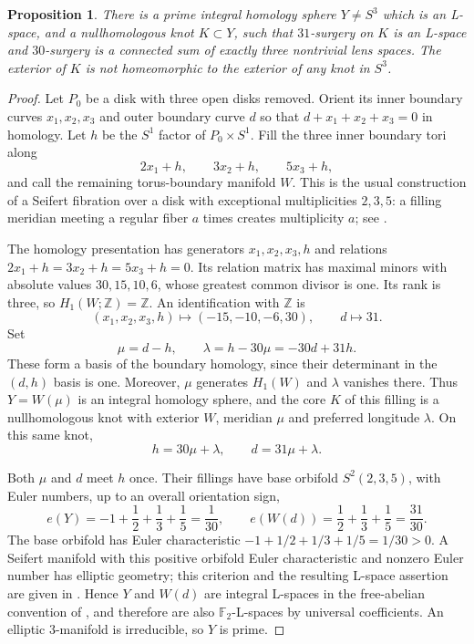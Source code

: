 \documentclass[11pt]{article}
\newtheorem{proposition}[theorem]{Proposition}
\theoremstyle{remark}
\newcommand{\Z}{\mathbb Z}
\newcommand{\F}{\mathbb F_2}
\begin{document}
\begin{proposition}\label{prop:ambient}
There is a prime integral homology sphere $Y\ne S^3$ which is an L-space, and a nullhomologous knot $K\subset Y$, such that $31$-surgery on $K$ is an L-space and $30$-surgery is a connected sum of exactly three nontrivial lens spaces. The exterior of $K$ is not homeomorphic to the exterior of any knot in $S^3$.
\end{proposition}
\begin{proof}
Let $P_0$ be a disk with three open disks removed. Orient its inner boundary curves $x_1,x_2,x_3$ and outer boundary curve $d$ so that $d+x_1+x_2+x_3=0$ in homology. Let $h$ be the $S^1$ factor of $P_0\times S^1$. Fill the three inner boundary tori along
\[
 2x_1+h,\qquad3x_2+h,\qquad5x_3+h,
\]
and call the remaining torus-boundary manifold $W$. This is the usual construction of a Seifert fibration over a disk with exceptional multiplicities $2,3,5$: a filling meridian meeting a regular fiber $a$ times creates multiplicity $a$; see \cite[Section~2.1, pp.~24--26]{Hatcher}.

The homology presentation has generators $x_1,x_2,x_3,h$ and relations $2x_1+h=3x_2+h=5x_3+h=0$. Its relation matrix has maximal minors with absolute values $30,15,10,6$, whose greatest common divisor is one. Its rank is three, so $H_1(W;\Z)=\Z$. An identification with $\Z$ is
\[
 (x_1,x_2,x_3,h)\longmapsto(-15,-10,-6,30),\qquad d\longmapsto31.
\]
Set
\[
 \mu=d-h,\qquad \lambda=h-30\mu=-30d+31h.
\]
These form a basis of the boundary homology, since their determinant in the $(d,h)$ basis is one. Moreover, $\mu$ generates $H_1(W)$ and $\lambda$ vanishes there. Thus $Y=W(\mu)$ is an integral homology sphere, and the core $K$ of this filling is a nullhomologous knot with exterior $W$, meridian $\mu$ and preferred longitude $\lambda$. On this same knot,
\[
 h=30\mu+\lambda,\qquad d=31\mu+\lambda.
\]

Both $\mu$ and $d$ meet $h$ once. Their fillings have base orbifold $S^2(2,3,5)$, with Euler numbers, up to an overall orientation sign,
\[
 e(Y)=-1+\frac12+\frac13+\frac15=\frac1{30},
 \qquad e(W(d))=\frac12+\frac13+\frac15=\frac{31}{30}.
\]
The base orbifold has Euler characteristic $-1+1/2+1/3+1/5=1/30>0$. A Seifert manifold with this positive orbifold Euler characteristic and nonzero Euler number has elliptic geometry; this criterion and the resulting L-space assertion are given in \cite[Proposition~2.3 and its proof]{OSLens}. Hence $Y$ and $W(d)$ are integral L-spaces in the free-abelian convention of \cite[Definition~1.1]{OSLens}, and therefore are also $\F$-L-spaces by universal coefficients. An elliptic $3$-manifold is irreducible, so $Y$ is prime.


\end{proof}
\end{document}
